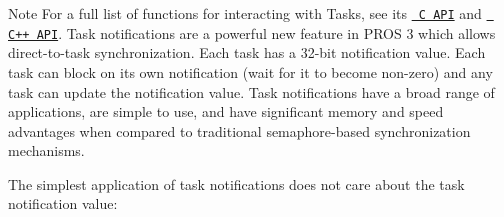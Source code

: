 \begin{DoxyNote}{Note}
For a full list of functions for interacting with Tasks, see its \href{../../api/c/rtos.html}{\texttt{ C A\+PI}} and \href{../../api/cpp/rtos.html}{\texttt{ C++ A\+PI}}. Task notifications are a powerful new feature in P\+R\+OS 3 which allows direct-\/to-\/task synchronization. Each task has a 32-\/bit notification value. Each task can block on its own notification (wait for it to become non-\/zero) and any task can update the notification value. Task notifications have a broad range of applications, are simple to use, and have significant memory and speed advantages when compared to traditional semaphore-\/based synchronization mechanisms.
\end{DoxyNote}
The simplest application of task notifications does not care about the task notification value\+: 